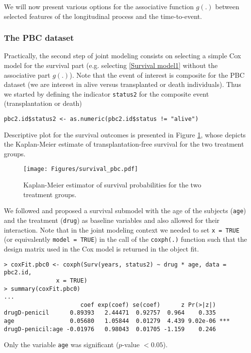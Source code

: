 \documentclass[12pt]{article}
\begin{document}
We will now present various options for the associative function $g(.)$ between selected features of the longitudinal process and the time-to-event. 


\subsubsection{The PBC dataset}

Practically, the second step of joint modeling consists on selecting a simple Cox model for the survival part (e.g. selecting \eqref{Survival model1} without the associative part $g(.)$). 
Note that the event of interest is composite for the PBC dataset (we are interest in alive versus transplanted or death individuals). 
Thus we started by defining the indicator \texttt{status2} for the composite event (transplantation or death)
\begin{verbatim}
pbc2.id$status2 <- as.numeric(pbc2.id$status != "alive")
\end{verbatim}
Descriptive plot for the survival outcomes is presented in Figure \ref{KM_pbc}, whose depicts the Kaplan-Meier estimate of transplantation-free survival for the two treatment groups.
\begin{figure}[!tb]
\centering
\texttt{[image: Figures/survival\_pbc.pdf]}
\caption{Kaplan-Meier estimator of survival probabilities for the two treatment groups.}
\label{KM_pbc}
\end{figure}
We followed \cite{JMbayes} and proposed a survival submodel with the age of the subjects (\texttt{age}) and the treatment (\texttt{drug}) as baseline variables and also allowed for their interaction. Note that in the joint modeling context  we needed to set \texttt{x = TRUE} (or equivalently \texttt{model = TRUE}) in the call of the \texttt{coxph(.)} function such that the design matrix used in the Cox model is returned in the object fit.
\begin{verbatim}
> coxFit.pbc0 <- coxph(Surv(years, status2) ~ drug * age, data = pbc2.id, 
			   x = TRUE)
> summary(coxFit.pbc0)
...
                      coef exp(coef) se(coef)      z Pr(>|z|)    
drugD-penicil      0.89393   2.44471  0.92757  0.964    0.335    
age                0.05680   1.05844  0.01279  4.439 9.02e-06 ***
drugD-penicil:age -0.01976   0.98043  0.01705 -1.159    0.246    
\end{verbatim}
Only the variable \texttt{age} was significant ($p$-value $<0.05$). 
\end{document}
